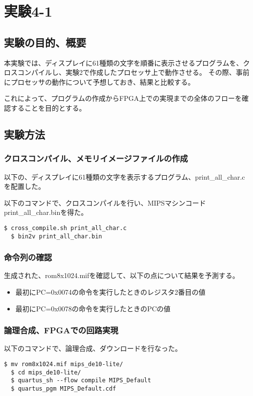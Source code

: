 \section{実験4-1}
\subsection{実験の目的、概要}
本実験では、ディスプレイに61種類の文字を順番に表示させるプログラムを、クロスコンパイルし、実験2で作成したプロセッサ上で動作させる。
その際、事前にプロセッサの動作について予想しておき、結果と比較する。

これによって、プログラムの作成からFPGA上での実現までの全体のフローを確認することを目的とする。

\subsection{実験方法}
\subsubsection{クロスコンパイル、メモリイメージファイルの作成}
以下の、ディスプレイに61種類の文字を表示するプログラム、print\_all\_char.cを配置した。


以下のコマンドで、クロスコンパイルを行い、MIPSマシンコードprint\_all\_char.binを得た。
\begin{lstlisting}[caption={クロスコンパイル、メモリイメージファイルの作成},label={クロスコンパイル、イメージファイルの作成4-1}]
  $ cross_compile.sh print_all_char.c
  $ bin2v print_all_char.bin
\end{lstlisting}

\subsubsection{命令列の確認}
生成された、rom8x1024.mifを確認して、以下の点について結果を予測する。
\begin{itemize}
  \item 最初にPC=0x0074の命令を実行したときのレジスタ2番目の値
  \item 最初にPC=0x0078の命令を実行したときのPCの値
\end{itemize}

\subsubsection{論理合成、FPGAでの回路実現}
以下のコマンドで、論理合成、ダウンロードを行なった。
\begin{lstlisting}[caption={論理合成、ダウンロード},label={論理合成、ダウンロード4-1}]
  $ mv rom8x1024.mif mips_de10-lite/
  $ cd mips_de10-lite/
  $ quartus_sh --flow compile MIPS_Default
  $ quartus_pgm MIPS_Default.cdf
\end{lstlisting}

